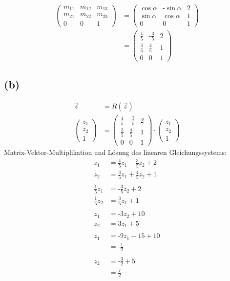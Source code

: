 \documentclass[a4paper]{scrartcl}
\begin{document}
\begin{align*}
\left(\begin{matrix} m_{11} & m_{12} & m_{13} \\ m_{21} & m_{22} & m_{23} \\ 0 & 0 & 1 \end{matrix}\right) &
= \left(\begin{matrix} \cos\alpha & \text{-}\sin\alpha & 2 \\ \sin\alpha & \cos\alpha & 1 \\ 0 & 0 & 1 \end{matrix}\right) \\
& = \left(\begin{matrix} \frac{4}{5} & \text{-}\frac{3}{5} & 2 \\ \frac{3}{5} & \frac{4}{5} & 1 \\ 0 & 0 & 1 \end{matrix}\right)
\end{align*}

\subsection*{(b)}
\begin{align*}
\vec{z} & = R\left(\vec{z}\right) \\
\left(\begin{matrix} z_1 \\ z_2 \\ 1 \end{matrix}\right) & = 
\left(\begin{matrix} \frac{4}{5} & \text{-}\frac{3}{5} & 2 \\ \frac{3}{5} & \frac{4}{5} & 1 \\ 0 & 0 & 1 \end{matrix}\right)
\cdot
\left(\begin{matrix} z_1 \\ z_2 \\ 1 \end{matrix}\right)
\end{align*}
Matrix-Vektor-Multiplikation und Lösung des linearen Gleichungssystems:
\begin{align*}
z_1 & = \frac{4}{5} z_1 - \frac{3}{5} z_2 + 2 \\
z_2 & = \frac{3}{5} z_1 + \frac{4}{5} z_2 + 1 \\
\\
\frac{1}{5} z_1 & =  \text{-}\frac{3}{5} z_2 + 2 \\
\frac{1}{5} z_2 & = \frac{3}{5} z_1 + 1 \\
\\
z_1 & =  \text{-} 3 z_2 + 10 \\
z_2 & = 3 z_1 + 5 \\
\\
z_1 & = \text{-}9 z_1 - 15 + 10 \\
    & = \text{-}\frac{1}{2} \\
\\
z_2 & = \text{-}\frac{3}{2} + 5 \\
    & = \frac{7}{2}
\end{align*}
\end{document}

